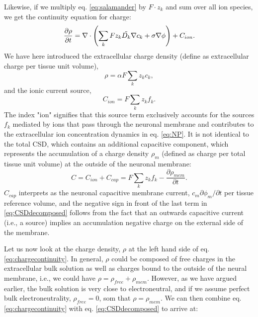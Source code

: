 Likewise, if we multiply eq. \ref{eq:salamander} by $F\cdot z_k$ and sum over all ion species, we get the continuity equation for charge: 
\begin{equation}
\frac{\partial \rho}{\partial t} =  \nabla \cdot \left (\sum_k{F z_k \tilde{D_k}{\bf \nabla} c_{k}} + \sigma\nabla\phi  \right)  + C_{ion}.
\label{eq:chargecontinuity}
\end{equation}
We have here introduced the extracellular charge density (define as extracellular charge per tissue unit volume), 
\begin{equation}
\rho = \alpha F \sum_k z_k c_k,  
\label{eq:roen}
\end{equation}
and the ionic current source, 
\begin{equation}
C_{ion} = F \sum_k z_k f_k. 
\label{eq:csden}
\end{equation}
The index "ion" signifies that this source term exclusively accounts for the sources $f_k$ mediated by ions that pass through the neuronal membrane and contributes to the extracellular ion concentration dynamics in eq. \ref{eq:NP}. It is not identical to the total CSD, which contains an additional capacitive component, which represents the accumulation of a charge density $\rho_m$ (defined as charge per total tissue unit volume) at the outside of the neuronal membrane:
\begin{equation}
C = C_{ion} + C_{cap} = F \sum_k z_k f_k - \frac{\partial \rho_{mem}}{\partial t}.
\label{eq:CSDdecomposed}
\end{equation}
$C_{cap}$ interprets as the neuronal capacitive membrane current, $c_m \partial \phi_m/\partial t$ per tissue reference volume, and the negative sign in front of the last term in \ref{eq:CSDdecomposed} follows from the fact that an outwards capacitive current (i.e., a source) implies an accumulation negative charge on the external side of the membrane.

Let us now look at the charge density, $\rho$ at the left hand side of eq. \ref{eq:chargecontinuity}. In general, $\rho$ could be composed of free charges in the extracellular bulk solution as well as charges bound to the outside of the neural membrane, i.e., we could have $\rho = \rho_{free} + \rho_{mem}$. However, as we have argued earlier, the bulk solution is very close to electroneutral, and if we assume perfect bulk electroneutrality, $\rho_{free} = 0$, som that $\rho=\rho_{mem}$. We can then combine eq. \ref{eq:chargecontinuity}  with eq. \ref{eq:CSDdecomposed} to arrive at:

